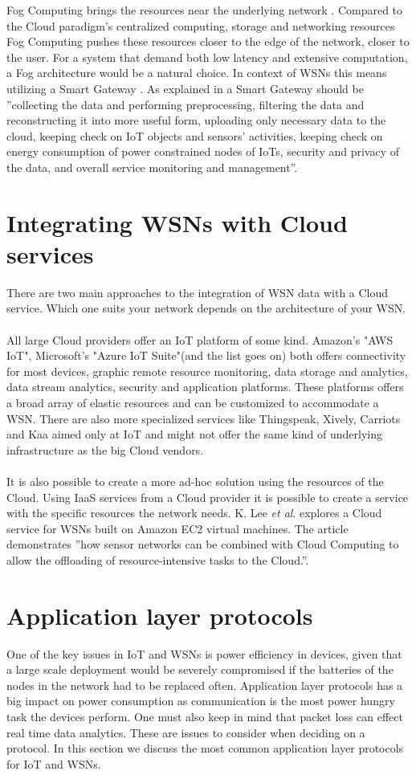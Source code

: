 \documentclass[]{uiophd}
\begin{document}
Fog Computing brings the resources near the underlying network \cite{6984239}. Compared to the Cloud paradigm's centralized computing, storage and networking resources Fog Computing pushes these resources closer to the edge of the network, closer to the user. For a system that demand both low latency and extensive computation, a Fog architecture would be a natural choice. In context of WSNs this means utilizing a Smart Gateway \cite{6984239}. As explained in \cite{69842392} a Smart Gateway should be ''collecting the data and performing preprocessing, filtering the data and reconstructing it into more useful form, uploading only necessary data to the cloud, keeping check on IoT objects and sensors’ activities, keeping check on energy consumption of power constrained nodes of IoTs, security and privacy of the data, and overall service monitoring and management''. 

\section{Integrating WSNs with Cloud services}
There are two main approaches to the integration of WSN data with a Cloud service. Which one suits your network depends on the architecture of your WSN.
\\\\
All large Cloud providers offer an IoT platform of some kind. Amazon's "AWS IoT", Microsoft's "Azure IoT Suite"(and the list goes on) both offers connectivity for most devices, graphic remote resource monitoring, data storage and analytics, data stream analytics, security and application platforms. These platforms offers a broad array of elastic resources and can be customized to accommodate a WSN. There are also more specialized services like Thingspeak, Xively, Carriots and Kaa aimed only at IoT and might not offer the same kind of underlying infrastructure as the big Cloud vendors.
\\\\
It is also possible to create a more ad-hoc solution using the resources of the Cloud. Using IaaS services from a Cloud provider it is possible to create a service with the specific resources the network needs. K. Lee \textit{et al}. \cite{5678063} explores a Cloud service for WSNs built on Amazon EC2 virtual machines. The article demonstrates ''how sensor networks can be combined with Cloud Computing to allow the offloading of resource-intensive tasks to the Cloud.''\cite{56780637}.

\section{Application layer protocols}
One of the key issues in IoT and WSNs is power efficiency in devices, given that a large scale deployment would be severely compromised if the batteries of the nodes in the network had to be replaced often. Application layer protocols has a big impact on power consumption as communication is the most power hungry task the devices perform. One must also keep in mind that packet loss can effect real time data analytics. These are issues to consider when deciding on a protocol. In this section we discuss the most common application layer protocols for IoT and WSNs.
\end{document}
